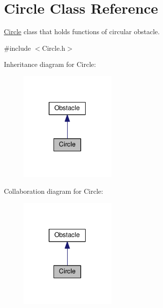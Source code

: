 \hypertarget{classCircle}{}\section{Circle Class Reference}
\label{classCircle}


\hyperlink{classCircle}{Circle} class that holds functions of circular obstacle.  




{\ttfamily \#include $<$Circle.\+h$>$}



Inheritance diagram for Circle\+:
\nopagebreak
\begin{figure}[H]
\begin{center}
\leavevmode
\includegraphics[width=136pt]{classCircle__inherit__graph}
\end{center}
\end{figure}


Collaboration diagram for Circle\+:
\nopagebreak
\begin{figure}[H]
\begin{center}
\leavevmode
\includegraphics[width=136pt]{classCircle__coll__graph}
\end{center}
\end{figure}

